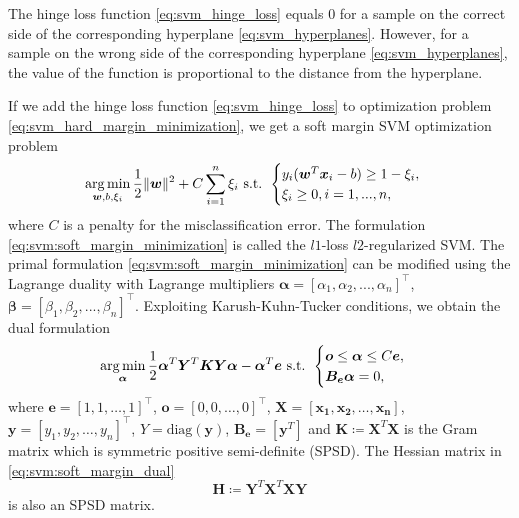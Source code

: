 The hinge loss function \eqref{eq:svm_hinge_loss} equals $0$ for a sample on the correct side of the corresponding hyperplane \eqref{eq:svm_hyperplanes}. However, for a sample on the wrong side of the corresponding hyperplane \eqref{eq:svm_hyperplanes}, the value of the function is proportional to the distance from the hyperplane.

If we add the hinge loss function \eqref{eq:svm_hinge_loss} to optimization problem \eqref{eq:svm_hard_margin_minimization}, we get a soft margin SVM optimization problem
\begin{equation}
    \operatorname*{arg\,min}_{\boldsymbol{w},b,\xi_i} \frac{1}{2}\|\boldsymbol{w}\|^2 + C\sum_{i = 1}^n\xi_i \text{ s.t. }
    \begin{cases}
        y_i(\boldsymbol{w}^T\boldsymbol{x}_i-b)\geq1 - \xi_i,\\
        \xi_i \geq 0 , i=1, ...,n,
    \end{cases}
    \label{eq:svm:soft_margin_minimization}
\end{equation}
where \( C \) is a penalty for the misclassification error. The formulation \eqref{eq:svm:soft_margin_minimization} is called the $l1$-loss $l2$-regularized SVM. The primal formulation \eqref{eq:svm:soft_margin_minimization} can be modified using the Lagrange duality with Lagrange multipliers $\boldsymbol{\alpha} = [\alpha_1, \alpha_2, ..., \alpha_n]^{\top}$, $\boldsymbol{\beta} = [\beta_1, \beta_2, ..., \beta_n]^{\top}$. Exploiting Karush-Kuhn-Tucker conditions, we obtain the dual formulation
\begin{equation}
    \operatorname*{arg\,min}_{\boldsymbol{\alpha}} \frac{1}{2} \boldsymbol{\alpha}^T\boldsymbol{Y}^T\boldsymbol{K}\boldsymbol{Y}\boldsymbol{\alpha} - \boldsymbol{\alpha}^T\boldsymbol{e} \text{ s.t. } 
    \begin{cases}
        \boldsymbol{o} \leq \boldsymbol{\alpha} \leq C\boldsymbol{e},\\
        \boldsymbol{B_e}\boldsymbol{\alpha}=0,
    \end{cases}
    \label{eq:svm:soft_margin_dual}
\end{equation}
where \( \boldsymbol{e} = [1,1, \dots,1]^{\top} \), \( \boldsymbol{o} = [0,0, \dots,0]^{\top} \), \( \boldsymbol{X} = [\boldsymbol{x_1},\boldsymbol{x_2}, \dots,\boldsymbol{x_n}] \), \( \boldsymbol{y} = [y_1,y_2, \dots,y_n]^{\top} \), \( Y = \text{diag}(\boldsymbol{y}) \), \( \boldsymbol{B_e} = [\boldsymbol{y}^T] \) and \( \boldsymbol{K}\coloneqq\boldsymbol{X}^T\boldsymbol{X} \) is the Gram matrix which is symmetric positive semi-definite (SPSD)\cite{Aeta2018}. The Hessian matrix in \eqref{eq:svm:soft_margin_dual}
\begin{equation}
    \boldsymbol{H} \coloneqq \boldsymbol{Y}^T\boldsymbol{X}^T\boldsymbol{X}\boldsymbol{Y}
    \label{eq:svm:hessian}
\end{equation}
is also an SPSD matrix.

